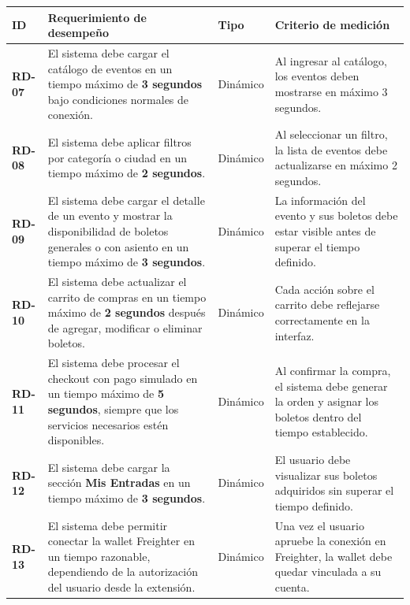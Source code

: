 \documentclass[12pt,letterpaper]{article}
\begin{document}
\begin{table}[H]
\centering
\tiny
\renewcommand{\arraystretch}{0.95}
\setlength{\tabcolsep}{2.5pt}

\begin{tabularx}{\textwidth}{|p{1.25cm}|X|p{1.4cm}|X|}
\hline
\textbf{ID} & \textbf{Requerimiento de desempeño} & \textbf{Tipo} & \textbf{Criterio de medición} \\ \hline

\textbf{RD-07} &
El sistema debe cargar el catálogo de eventos en un tiempo máximo de \textbf{3 segundos} bajo condiciones normales de conexión. &
Dinámico &
Al ingresar al catálogo, los eventos deben mostrarse en máximo 3 segundos. \\ \hline

\textbf{RD-08} &
El sistema debe aplicar filtros por categoría o ciudad en un tiempo máximo de \textbf{2 segundos}. &
Dinámico &
Al seleccionar un filtro, la lista de eventos debe actualizarse en máximo 2 segundos. \\ \hline

\textbf{RD-09} &
El sistema debe cargar el detalle de un evento y mostrar la disponibilidad de boletos generales o con asiento en un tiempo máximo de \textbf{3 segundos}. &
Dinámico &
La información del evento y sus boletos debe estar visible antes de superar el tiempo definido. \\ \hline

\textbf{RD-10} &
El sistema debe actualizar el carrito de compras en un tiempo máximo de \textbf{2 segundos} después de agregar, modificar o eliminar boletos. &
Dinámico &
Cada acción sobre el carrito debe reflejarse correctamente en la interfaz. \\ \hline

\textbf{RD-11} &
El sistema debe procesar el checkout con pago simulado en un tiempo máximo de \textbf{5 segundos}, siempre que los servicios necesarios estén disponibles. &
Dinámico &
Al confirmar la compra, el sistema debe generar la orden y asignar los boletos dentro del tiempo establecido. \\ \hline

\textbf{RD-12} &
El sistema debe cargar la sección \textbf{Mis Entradas} en un tiempo máximo de \textbf{3 segundos}. &
Dinámico &
El usuario debe visualizar sus boletos adquiridos sin superar el tiempo definido. \\ \hline

\textbf{RD-13} &
El sistema debe permitir conectar la wallet Freighter en un tiempo razonable, dependiendo de la autorización del usuario desde la extensión. &
Dinámico &
Una vez el usuario apruebe la conexión en Freighter, la wallet debe quedar vinculada a su cuenta. \\ \hline


\end{tabularx}
\end{table}
\end{document}

